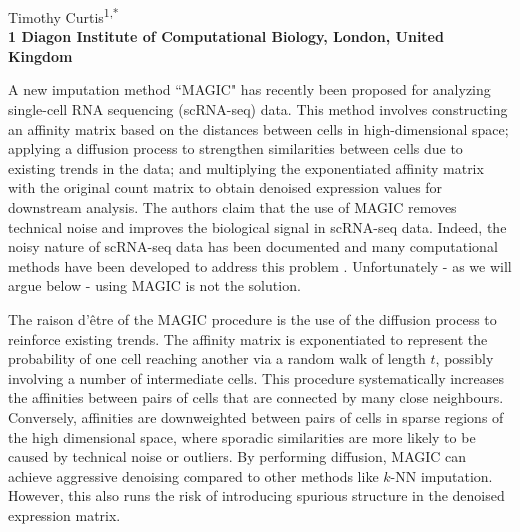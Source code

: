 \documentclass[10pt,letterpaper]{article}
\begin{document}
\vspace*{0.35in}

\begin{flushleft}
{\Large
    \textbf{}
}
\newline

Timothy Curtis\textsuperscript{1,*}
\\
\bigskip
\bf{1} Diagon Institute of Computational Biology, London, United Kingdom \\
\bigskip

\end{flushleft}

A new imputation method ``MAGIC" \cite{vandijk2018recovering} has recently been proposed for analyzing single-cell RNA sequencing (scRNA-seq) data.
This method involves constructing an affinity matrix based on the distances between cells in high-dimensional space;
applying a diffusion process to strengthen similarities between cells due to existing trends in the data;
and multiplying the exponentiated affinity matrix with the original count matrix to obtain denoised expression values for downstream analysis.
The authors claim that the use of MAGIC removes technical noise and improves the biological signal in scRNA-seq data.
Indeed, the noisy nature of scRNA-seq data has been documented \cite{grun2015design} and many computational methods have been developed to address this problem \cite{bacher2016design}.
Unfortunately - as we will argue below - using MAGIC is not the solution.

The raison d'\^etre of the MAGIC procedure is the use of the diffusion process to reinforce existing trends.
The affinity matrix is exponentiated to represent the probability of one cell reaching another via a random walk of length $t$, possibly involving a number of intermediate cells.
This procedure systematically increases the affinities between pairs of cells that are connected by many close neighbours.
Conversely, affinities are downweighted between pairs of cells in sparse regions of the high dimensional space, 
where sporadic similarities are more likely to be caused by technical noise or outliers.
By performing diffusion, MAGIC can achieve aggressive denoising compared to other methods like $k$-NN imputation.
However, this also runs the risk of introducing spurious structure in the denoised expression matrix.
\end{document}
